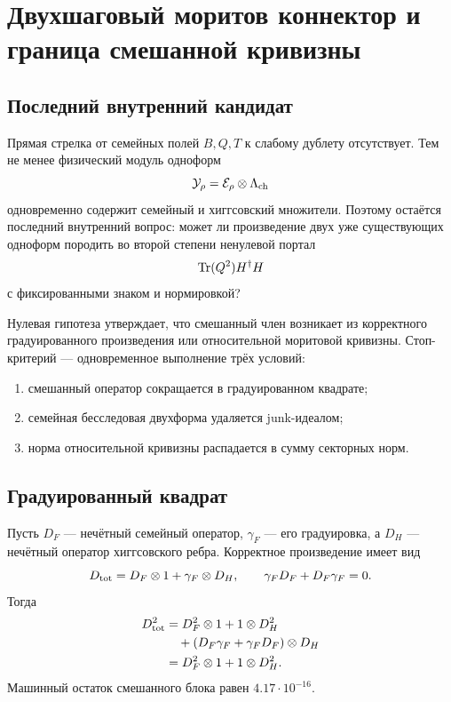 \chapter{Двухшаговый моритов коннектор и граница смешанной кривизны}
\label{ch:v6-spectral-transition-morita-two-step-connector-gate}

\section{Последний внутренний кандидат}

Прямая стрелка от семейных полей $B,Q,T$ к слабому дублету отсутствует.
Тем не менее физический модуль одноформ
\begin{equation}
 \mathcal Y_\rho=\mathcal E_\rho\otimes\Lambda_{\rm ch}
\end{equation}
одновременно содержит семейный и хиггсовский множители. Поэтому остаётся
последний внутренний вопрос: может ли произведение двух уже существующих
одноформ породить во второй степени ненулевой портал
\begin{equation}
 \operatorname{Tr}(Q^2)H^\dagger H
 \label{eq:v6-two-step-target-portal}
\end{equation}
с фиксированными знаком и нормировкой?

Нулевая гипотеза утверждает, что смешанный член возникает из корректного
градуированного произведения или относительной моритовой кривизны.
Стоп-критерий --- одновременное выполнение трёх условий:
\begin{enumerate}
 \item смешанный оператор сокращается в градуированном квадрате;
 \item семейная бесследовая двухформа удаляется junk-идеалом;
 \item норма относительной кривизны распадается в сумму секторных норм.
\end{enumerate}

\section{Градуированный квадрат}

Пусть $D_F$ --- нечётный семейный оператор, $\gamma_F$ --- его
градуировка, а $D_H$ --- нечётный оператор хиггсовского ребра. Корректное
произведение имеет вид
\begin{equation}
 D_{\rm tot}=D_F\otimes1+\gamma_F\otimes D_H,
 \qquad
 \gamma_FD_F+D_F\gamma_F=0.
 \label{eq:v6-two-step-graded-product}
\end{equation}
Тогда
\begin{align}
 D_{\rm tot}^2
 &=D_F^2\otimes1+1\otimes D_H^2\nonumber\\
 &\quad+(D_F\gamma_F+\gamma_FD_F)\otimes D_H\nonumber\\
 &=D_F^2\otimes1+1\otimes D_H^2.
 \label{eq:v6-two-step-cross-cancellation}
\end{align}
Машинный остаток смешанного блока равен
$4.17\cdot10^{-16}$.


